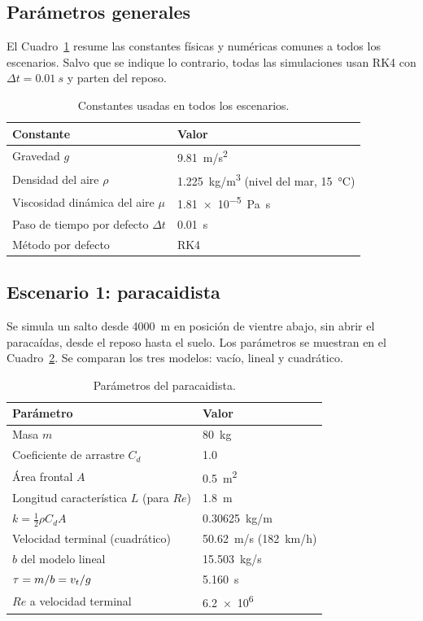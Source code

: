 \subsection{Parámetros generales}

El Cuadro~\ref{tab:constantes} resume las constantes físicas y numéricas comunes a todos los escenarios. Salvo que se indique lo contrario, todas las simulaciones usan RK4 con $\Delta t = \qty{0.01}{s}$ y parten del reposo.

\begin{table}[H]
  \centering
  \caption{Constantes usadas en todos los escenarios.}
  \label{tab:constantes}
  \begin{tabular}{@{}ll@{}}
    \toprule
    Constante & Valor \\
    \midrule
    Gravedad $g$ & \qty{9.81}{m/s^2} \\
    Densidad del aire $\rho$ & \qty{1.225}{kg/m^3} (nivel del mar, \qty{15}{\degreeCelsius}) \\
    Viscosidad dinámica del aire $\mu$ & \qty{1.81e-5}{\pascal\second} \\
    Paso de tiempo por defecto $\Delta t$ & \qty{0.01}{s} \\
    Método por defecto & RK4 \\
    \bottomrule
  \end{tabular}
\end{table}

\subsection{Escenario 1: paracaidista}

Se simula un salto desde \qty{4000}{m} en posición de vientre abajo, sin abrir el paracaídas, desde el reposo hasta el suelo. Los parámetros se muestran en el Cuadro~\ref{tab:paracaidista-param}. Se comparan los tres modelos: vacío, lineal y cuadrático.

\begin{table}[H]
  \centering
  \caption{Parámetros del paracaidista.}
  \label{tab:paracaidista-param}
  \begin{tabular}{@{}ll@{}}
    \toprule
    Parámetro & Valor \\
    \midrule
    Masa $m$ & \qty{80}{kg} \\
    Coeficiente de arrastre $C_d$ & 1.0 \\
    Área frontal $A$ & \qty{0.5}{m^2} \\
    Longitud característica $L$ (para $Re$) & \qty{1.8}{m} \\
    $k = \tfrac12\rho C_d A$ & \qty{0.30625}{kg/m} \\
    Velocidad terminal (cuadrático) & \qty{50.62}{m/s} (\qty{182}{km/h}) \\
    $b$ del modelo lineal & \qty{15.503}{kg/s} \\
    $\tau = m/b = v_t/g$ & \qty{5.160}{s} \\
    $Re$ a velocidad terminal & \num{6.2e6} \\
    \bottomrule
  \end{tabular}
\end{table}

